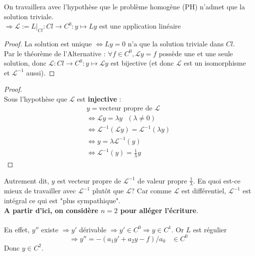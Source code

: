 \documentclass[british,french,11pt, a4paper, openany]{book}
\begin{document}
		On travaillera avec l'hypothèse que le problème homogène (PH) n'admet que la solution triviale.\\ $\Rightarrow \mathcal{L} := L|_{Cl} : Cl \rightarrow C^0 : y \mapsto Ly$ est une application linéaire
		\begin{proof}
			La solution est unique $\Leftrightarrow Ly = 0$ n'a que la solution triviale dans $Cl$. \\Par le théorème de l'Alternative : $\forall f \in C^0, \mathcal{L}y = f$ possède une et une seule solution, donc $\mathcal{L} : Cl \rightarrow C^0 : y \mapsto \mathcal{L}y$ est bijective (et donc $\mathcal{L}$ est un isomorphisme et  $\mathcal{L}^{-1}$ aussi).
		\end{proof}
														
		\begin{proof}
			\ \\ Sous l'hypothèse que $\mathcal{L}$ est \textbf{injective} :
			\begin{eqnarray}
				y = \text{vecteur propre de }\mathcal{L}\\
				\Leftrightarrow \mathcal{L}y = \lambda y\ \ \ (\lambda \neq 0)\\
				\Leftrightarrow \mathcal{L}^{-1}(\mathcal{L}y) = \mathcal{L}^{-1}(\lambda y)\\
				\Leftrightarrow y = \lambda \mathcal{L}^{-1}(y)\\
				\Leftrightarrow \mathcal{L}^{-1}(y) = \frac{1}{\lambda}y
			\end{eqnarray}
		\end{proof}
		Autrement dit, $y$ est vecteur propre de $\mathcal{L}^{-1}$ de valeur propre $\frac{1}{\lambda}$. En quoi est-ce mieux de travailler avec $\mathcal{L}^{-1}$ plutôt que $\mathcal{L}$? Car comme $\mathcal{L}$ est différentiel, $\mathcal{L}^{-1}$ est intégral ce qui est "plus sympathique".\\
		\textbf{A partir d'ici, on considère $n=2$ pour alléger l'écriture}.\\
														
		\ \\
		En effet, $y''$ existe $\Rightarrow y'$ dérivable $\Rightarrow y' \in C^0 \Rightarrow y \in C^1$. Or $L$ est régulier 
		\begin{equation}
			\Rightarrow y'' = -(a_1y' + a_2y-f)/a_0\ \ \ \ \in C^0
		\end{equation}
		Donc $y \in C^2$.
														
\end{document}
